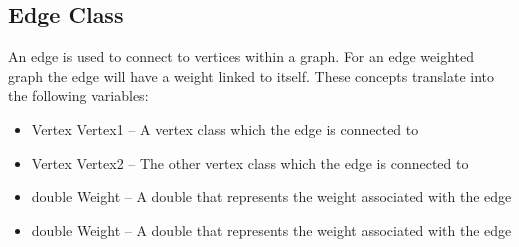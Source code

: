 \documentclass{AISB2008}
\begin{document}
\subsection{Edge Class}

An edge is used to connect to vertices within a graph. For an edge weighted graph the edge will have a weight linked to itself. These concepts translate into the following variables:

\begin{itemize}
\item Vertex Vertex1 – A vertex class which the edge is connected to
\item Vertex Vertex2 – The other vertex class which the edge is connected to
\item double Weight – A double that represents the weight associated with the edge
\item double Weight – A double that represents the weight associated with the edge
\end{itemize}
\end{document}
